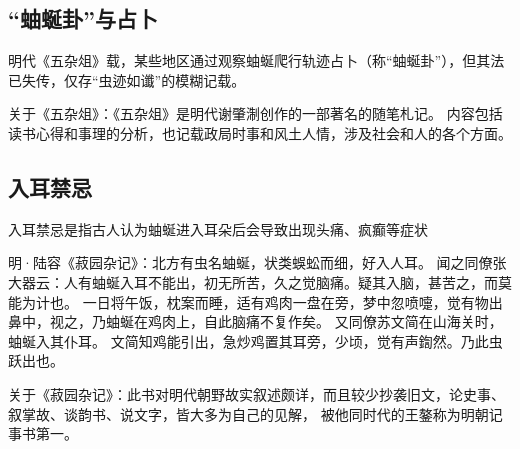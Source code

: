 \subsection{``蚰蜒卦''与占卜}

明代《五杂俎》载，某些地区通过观察蚰蜒爬行轨迹占卜（称``蚰蜒卦''），但其法已失传，仅存``虫迹如谶''的模糊记载。

关于《五杂俎》：《五杂俎》是明代谢肇淛创作的一部著名的随笔札记。
内容包括读书心得和事理的分析，也记载政局时事和风土人情，涉及社会和人的各个方面。

\subsection{入耳禁忌}
入耳禁忌是指古人认为蚰蜒进入耳朵后会导致出现头痛、疯癫等症状

明·陆容《菽园杂记》：北方有虫名蚰蜒，状类蜈蚣而细，好入人耳。
闻之同僚张大器云：人有蚰蜒入耳不能出，初无所苦，久之觉脑痛。疑其入脑，甚苦之，而莫能为计也。
一日将午饭，枕案而睡，适有鸡肉一盘在旁，梦中忽喷嚏，觉有物出鼻中，视之，乃蚰蜒在鸡肉上，自此脑痛不复作矣。
又同僚苏文简在山海关时，蚰蜒入其仆耳。
文简知鸡能引出，急炒鸡置其耳旁，少顷，觉有声鍧然。乃此虫跃出也。

关于《菽园杂记》：此书对明代朝野故实叙述颇详，而且较少抄袭旧文，论史事、叙掌故、谈韵书、说文字，皆大多为自己的见解，
被他同时代的王鏊称为明朝记事书第一。
